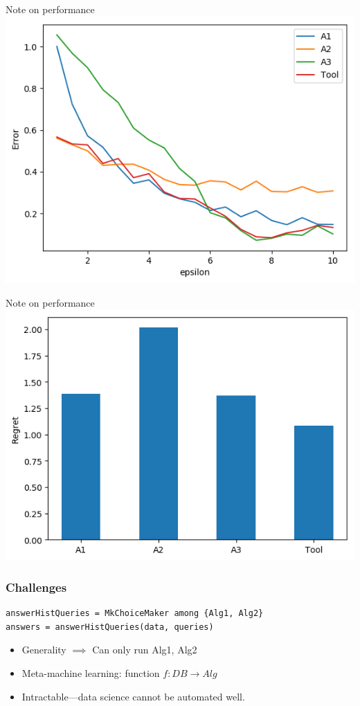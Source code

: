 \documentclass{beamer}
\begin{document}
\begin{frame}{Note on performance}
\includegraphics[scale=0.7]{hist_graphs/Perf.png}
\end{frame}

\begin{frame}{Note on performance}
\includegraphics[scale=0.7]{hist_graphs/regret.png}
\end{frame}

\begin{frame}[fragile]\frametitle{Challenges}
\begin{lstlisting}[style=MyPythonStyle]
answerHistQueries = MkChoiceMaker among {Alg1, Alg2}
answers = answerHistQueries(data, queries)
\end{lstlisting}
\begin{itemize}
\item Generality $\implies$ Can only run Alg1, Alg2
\item Meta-machine learning: function $f: DB \rightarrow Alg$
\item Intractable---data science cannot be automated well.
\end{itemize}
\end{frame}
\end{document}
